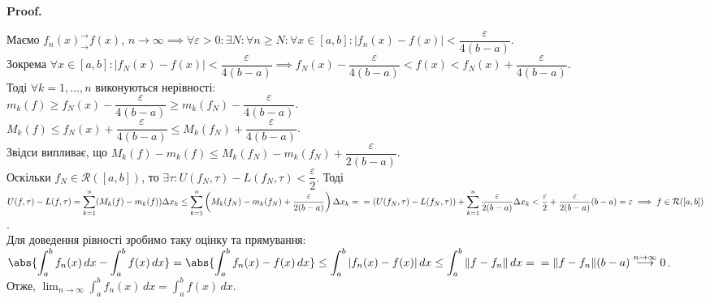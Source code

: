\documentclass[a4paper, 10pt]{article}
\makeatletter
\def\huge{\displaystyle}
\def\qed{$\blacksquare$}
\theoremstyle{theoremdd}
\theoremstyle{theoremdd}
\theoremstyle{theoremdd}
\theoremstyle{theoremdd}
\theoremstyle{theoremdd}
\theoremstyle{theoremdd}
\theoremstyle{theoremdd}
\theoremstyle{theoremdd}
\theoremstyle{theoremdd}
\renewenvironment{proof}[1][Proof.\\]{\par
\pushQED{\hfill \qed}%
\normalfont \topsep6\p@\@plus6\p@\relax
\trivlist
\item\relax
{\bfseries
#1\@addpunct{.}}\hspace\labelsep\ignorespaces
}{%
\popQED\endtrivlist\@endpefalse
}
\makeatother
\begin{document}
\begin{proof}
Маємо $f_n(x)^\rightarrow_\rightarrow f(x)$, $n \to \infty \implies \forall \varepsilon > 0: \exists N: \forall n \geq N: \forall x \in [a,b]: |f_n(x)-f(x)| < \dfrac{\varepsilon}{4(b-a)}$.\\
Зокрема $\forall x \in [a,b]: |f_N(x) - f(x)| < \dfrac{\varepsilon}{4(b-a)} \implies f_N(x) - \dfrac{\varepsilon}{4(b-a)} < f(x) < f_N(x) + \dfrac{\varepsilon}{4(b-a)}$. \\
Тоді $\forall k = 1,\dots,n$ виконуються нерівності:\\
$m_k(f) \geq f_N(x) - \dfrac{\varepsilon}{4(b-a)} \geq m_k(f_N) - \dfrac{\varepsilon}{4(b-a)}$.\\
$M_k(f) \leq f_N(x) + \dfrac{\varepsilon}{4(b-a)} \leq M_k(f_N) + \dfrac{\varepsilon}{4(b-a)}$.\\
Звідси випливає, що $M_k(f) - m_k(f) \leq M_k(f_N) - m_k(f_N) + \dfrac{\varepsilon}{2(b-a)}$.\\
Оскільки $f_N \in \mathcal{R}([a,b])$, то $\exists \tau: U(f_N,\tau) - L(f_N,\tau) < \dfrac{\varepsilon}{2}$. Тоді\\
$U(f,\tau) - L(f,\tau) = \huge\sum_{k=1}^n (M_k(f)-m_k(f))\Delta x_k \leq \huge\sum_{k=1}^n \left( M_k(f_N) - m_k(f_N) + \dfrac{\varepsilon}{2(b-a)} \right) \Delta x_k = \\ = (U(f_N,\tau) - L(f_N,\tau)) + \huge\sum_{k=1}^n \dfrac{\varepsilon}{2(b-a)}\Delta x_k < \dfrac{\varepsilon}{2} + \dfrac{\varepsilon}{2(b-a)} (b-a) = \varepsilon \implies f \in \mathcal{R}([a,b])$.\\
Для доведення рівності зробимо таку оцінку та прямування:\\
$\huge\abs{\int_a^b f_n(x)\,dx - \int_a^b f(x)\,dx} = \abs{\int_a^b f_n(x)-f(x)\,dx} \leq \int_a^b |f_n(x)-f(x)|\,dx \leq \int_a^b \|f-f_n\|\,dx = \\ = \|f-f_n\| (b-a) \overset{n \to \infty}{\longrightarrow} 0$.\\
Отже, $\huge\lim_{n \to \infty} \int_a^b f_n(x)\,dx = \int_a^b f(x)\,dx$.
\end{proof}
\end{document}
